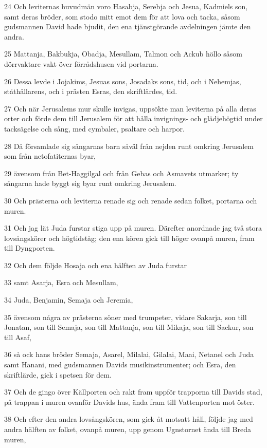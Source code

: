 \par 24 Och leviternas huvudmän voro Hasabja, Serebja och Jesua, Kadmiels son, samt deras bröder, som stodo mitt emot dem för att lova och tacka, såsom gudsmannen David hade bjudit, den ena tjänstgörande avdelningen jämte den andra.
\par 25 Mattanja, Bakbukja, Obadja, Mesullam, Talmon och Ackub höllo såsom dörrvaktare vakt över förrådshusen vid portarna.
\par 26 Dessa levde i Jojakims, Jesuas sons, Josadaks sons, tid, och i Nehemjas, ståthållarens, och i prästen Esras, den skriftlärdes, tid.
\par 27 Och när Jerusalems mur skulle invigas, uppsökte man leviterna på alla deras orter och förde dem till Jerusalem för att hålla invignings- och glädjehögtid under tacksägelse och sång, med cymbaler, psaltare och harpor.
\par 28 Då församlade sig sångarnas barn såväl från nejden runt omkring Jerusalem som från netofatiternas byar,
\par 29 ävensom från Bet-Haggilgal och från Gebas och Asmavets utmarker; ty sångarna hade byggt sig byar runt omkring Jerusalem.
\par 30 Och prästerna och leviterna renade sig och renade sedan folket, portarna och muren.
\par 31 Och jag lät Juda furstar stiga upp på muren. Därefter anordnade jag två stora lovsångskörer och högtidståg; den ena kören gick till höger ovanpå muren, fram till Dyngporten.
\par 32 Och dem följde Hosaja och ena hälften av Juda furstar
\par 33 samt Asarja, Esra och Mesullam,
\par 34 Juda, Benjamin, Semaja och Jeremia,
\par 35 ävensom några av prästerna söner med trumpeter, vidare Sakarja, son till Jonatan, son till Semaja, son till Mattanja, son till Mikaja, son till Sackur, son till Asaf,
\par 36 så ock hans bröder Semaja, Asarel, Milalai, Gilalai, Maai, Netanel och Juda samt Hanani, med gudsmannen Davids musikinstrumenter; och Esra, den skriftlärde, gick i spetsen för dem.
\par 37 Och de gingo över Källporten och rakt fram uppför trapporna till Davids stad, på trappan i muren ovanför Davids hus, ända fram till Vattenporten mot öster.
\par 38 Och efter den andra lovsångskören, som gick åt motsatt håll, följde jag med andra hälften av folket, ovanpå muren, upp genom Ugnstornet ända till Breda muren,

